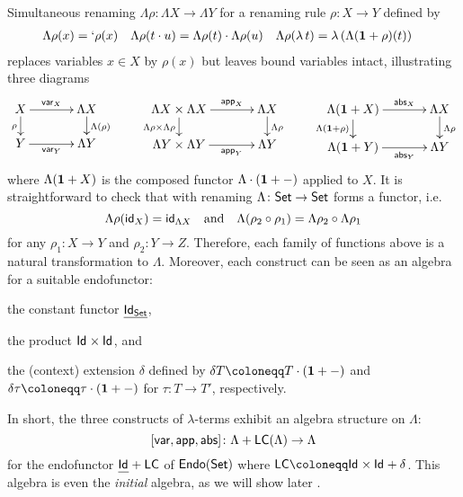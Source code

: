 \documentclass[acmsmall,review]{acmart}\settopmatter{printfolios=true,printccs=false,printacmref=false}
\theoremstyle{acmdefinition}
\begin{document}
\begin{example}
  Simultaneous renaming $\Lambda\rho\colon \Lambda X \to \Lambda Y$ for a renaming rule  $\rho\colon X \to Y$  
  defined by
  \begin{align*}
    \Lambda\rho (x) & =  `\rho(x) & \Lambda\rho (t \cdot u)  & =  \Lambda\rho(t) \cdot \Lambda\rho(u) & \Lambda\rho (\lambda\,t) & =  \lambda\left(\Lambda(\Unit + \rho)(t)\right)
  \end{align*}
  replaces variables $x \in X$ by $\rho(x)$ but leaves bound variables intact, illustrating three diagrams
  \[
    \xymatrix@C+1em@R-1em{
      X \ar[r]^-{\mathsf{var}_X} \ar[d]_{\rho} & \Lambda X \ar[d]^{\Lambda(\rho)} \\
      Y \ar[r]_-{\mathsf{var}_Y} & \Lambda Y 
    }
    \qquad
    \xymatrix@C+1em@R-1em{
      \Lambda X\times\Lambda X \ar[r]^-{\mathsf{app}_X} \ar[d]_{\Lambda\rho \times \Lambda\rho} & \Lambda X \ar[d]^{\Lambda\rho} \\
      \Lambda Y\times\Lambda Y \ar[r]_-{\mathsf{app}_Y} & \Lambda Y 
    }
    \qquad
    \xymatrix@C+1em@R-1em{
      \Lambda(\Unit + X) \ar[r]^-{\mathsf{abs}_X} \ar[d]_{\Lambda(\Unit + \rho)} & \Lambda X \ar[d]^{\Lambda\rho} \\
      \Lambda(\Unit + Y) \ar[r]_-{\mathsf{abs}_Y} & \Lambda Y
    }
  \]
  where $\Lambda(\Unit + X)$ is the composed functor $\Lambda \fcomp (\Unit + \blank)$ applied to $X$.
  It is straightforward to check that with renaming $\Lambda\colon\set\to\set$ forms a functor, i.e.
  \[
    \Lambda\rho(\idfunc[X]) = \idfunc[\Lambda X] \quad\text{and}\quad \Lambda(\rho_2 \comp \rho_1)  = \Lambda\rho_2 \comp \Lambda\rho_1
  \]
  for any $\rho_1\colon X \to Y$ and $\rho_2\colon Y \to Z$.
  Therefore, each family of functions above is a natural transformation to $\Lambda$. 
  Moreover, each construct can be seen as an algebra for a suitable endofunctor:
  \begin{enumerate*}
    \item the constant functor $\underline{\Id[\set]}$, 
    \item the product $\Id \times \Id$, and
    \item the (context) extension $\delta$ defined by $\delta T \defid T \fcomp (\Unit + \blank)$ and $\delta\tau \defid \tau \fcomp (\Unit + \blank)$ for $\tau \colon T \to T'$, respectively.
  \end{enumerate*}
  In short, the three constructs of $\lambda$-terms exhibit an algebra structure on $\Lambda$:
  \[
    [\mathsf{var}, \mathsf{app}, \mathsf{abs}] \colon \Lambda + \LC(\Lambda) \to \Lambda
  \]
  for the endofunctor $\underline{\Id} + \LC$ of $\Endo{\set}$ where $\LC \defid \Id \times \Id + \delta$.
  This algebra is even the \emph{initial} algebra, as we will show later .
\end{example}
\end{document}
